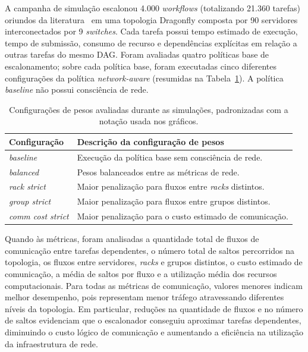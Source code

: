 \documentclass[12pt]{article}
\begin{document}
A campanha de simulação escalonou 4.000 \textit{workflows} (totalizando 21.360 tarefas) oriundos da literatura~\cite{juve2013characterizing} em uma topologia Dragonfly composta por 90 servidores interconectados por 9 \textit{switches}.
%
Cada tarefa possui tempo estimado de execução, tempo de submissão, consumo de recurso e dependências explícitas em relação a outras tarefas do mesmo DAG.
%
Foram avaliadas quatro políticas base de escalonamento; sobre cada política base, foram executadas cinco diferentes configurações da política \textit{network-aware} (resumidas na Tabela~\ref{tab:cenarios_avaliados}). 
%
A política \textit{baseline} não possui consciência de rede. 

\begin{table}[h!]
\centering
\caption{Configurações de pesos avaliadas durante as simulações, padronizadas com a notação usada nos gráficos.}
\label{tab:cenarios_avaliados}
\begin{tabular}{ll}
\hline
\textbf{Configuração} & \textbf{Descrição da configuração de pesos} \\
\hline
\textit{baseline} & Execução da política base sem consciência de rede. \\
\textit{balanced} & Pesos balanceados entre as métricas de rede. \\
\textit{rack strict} & Maior penalização para fluxos entre \textit{racks} distintos. \\
\textit{group strict} & Maior penalização para fluxos entre grupos distintos. \\
\textit{comm cost strict} & Maior penalização para o custo estimado de comunicação. \\
\hline
\end{tabular}
\end{table}

Quando às métricas, foram analisadas a quantidade total de fluxos de comunicação entre tarefas dependentes, o número total de saltos percorridos na topologia, os fluxos entre servidores, \textit{racks} e grupos distintos, o custo estimado de comunicação, a média de saltos por fluxo e a utilização média dos recursos computacionais.
%
Para todas as métricas de comunicação, valores menores indicam melhor desempenho, pois representam menor tráfego atravessando diferentes níveis da topologia. Em particular, reduções na quantidade de fluxos e no número de saltos evidenciam que o escalonador conseguiu aproximar tarefas dependentes, diminuindo o custo lógico de comunicação e aumentando a eficiência na utilização da infraestrutura de rede.
\end{document}
